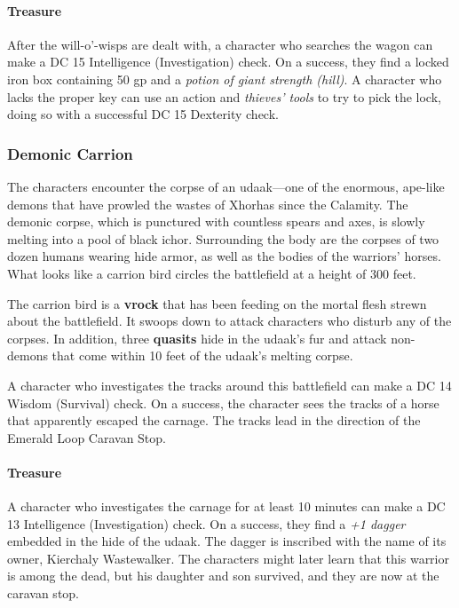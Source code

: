 \documentclass[letterpaper, 11pt, bg=full, twocolumn]{dndbook}
\begin{document}
\paragraph{Treasure}

After the will-o'-wisps are dealt with, a character who searches the wagon can make a DC 15 Intelligence (Investigation) check. On a success, they find a locked iron box containing 50 gp and a \textit{potion of giant strength (hill)}. A character who lacks the proper key can use an action and \textit{thieves' tools} to try to pick the lock, doing so with a successful DC 15 Dexterity check.


\subsubsection{Demonic Carrion}

The characters encounter the corpse of an udaak---one of the enormous, ape-like demons that have prowled the wastes of Xhorhas since the Calamity. The demonic corpse, which is punctured with countless spears and axes, is slowly melting into a pool of black ichor. Surrounding the body are the corpses of two dozen humans wearing hide armor, as well as the bodies of the warriors' horses. What looks like a carrion bird circles the battlefield at a height of 300 feet.

The carrion bird is a \textbf{vrock} that has been feeding on the mortal flesh strewn about the battlefield. It swoops down to attack characters who disturb any of the corpses. In addition, three \textbf{quasits} hide in the udaak's fur and attack non-demons that come within 10 feet of the udaak's melting corpse.

A character who investigates the tracks around this battlefield can make a DC 14 Wisdom (Survival) check. On a success, the character sees the tracks of a horse that apparently escaped the carnage. The tracks lead in the direction of the Emerald Loop Caravan Stop.

\paragraph{Treasure}

A character who investigates the carnage for at least 10 minutes can make a DC 13 Intelligence (Investigation) check. On a success, they find a \textit{+1 dagger} embedded in the hide of the udaak. The dagger is inscribed with the name of its owner, Kierchaly Wastewalker. The characters might later learn that this warrior is among the dead, but his daughter and son survived, and they are now at the caravan stop.
\end{document}
